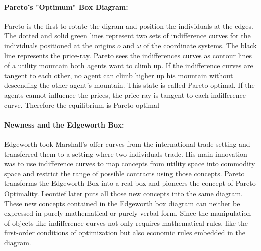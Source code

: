\documentclass[12pt,a4paper]{article}
\begin{document}
\paragraph{Pareto’s "Optimum" Box Diagram:}
Pareto is the first to rotate the digram and position the individuals at the edges. The dotted and solid green lines represent two sets of indifference curves for the individuals positioned at the origins $o$ and $\omega$ of the coordinate systems. The black line represents the price-ray.
Pareto sees the indifferences curves as contour lines of a utility mountain both agents want to climb up. If the indifference curves are tangent to each other, no agent can climb higher up his mountain without descending the other agent's mountain. This state is called Pareto optimal. If the agents cannot influence the prices, the price-ray is tangent to each indifference curve. Therefore the equilibrium is Pareto optimal


\paragraph{Newness and the Edgeworth Box:}
Edgeworth took Marshall's offer curves from the international trade setting and transferred them to a setting where two individuals trade. His main innovation was to use indifference curves to map concepts from utility space into commodity space and restrict the range of possible contracts using those concepts.
Pareto transforms the Edgeworth Box into a real box and pioneers the concept of Pareto Optimality.
Leontief later puts all those new concepts into the same diagram.
These new concepts contained in the Edgeworth box diagram can neither be expressed in purely mathematical or purely verbal form. Since the manipulation of objects like indifference curves not only requires mathematical rules, like the first-order conditions of optimization but also economic rules embedded in the diagram.
\end{document}
